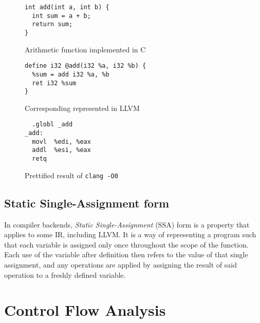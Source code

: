 \documentclass{article}
\begin{document}
\begin{figure}[!ht]
   \begin{minipage}{0.48\textwidth}
     \centering
     \begin{verbatim}
int add(int a, int b) {
  int sum = a + b;
  return sum;
}
     \end{verbatim}
     \caption{Arithmetic function implemented in C}\label{fig:addc}
   \end{minipage}\hfill
   \begin{minipage}{0.48\textwidth}
     \centering
     \begin{verbatim}
define i32 @add(i32 %a, i32 %b) {
  %sum = add i32 %a, %b
  ret i32 %sum
}
     \end{verbatim}
     \caption{Corresponding represented in LLVM}\label{fig:addll}
   \end{minipage}
   \begin{center}
   \begin{minipage}{0.48\textwidth}
     \centering
     \begin{verbatim}
  .globl _add
_add:
  movl	%edi, %eax
  addl	%esi, %eax
  retq
     \end{verbatim}
     \caption{Prettified result of \texttt{clang -O0}}\label{fig:addx86}
   \end{minipage}
   \end{center}
\end{figure}


\subsection{Static Single-Assignment form}
In compiler backends, \textit{Static Single-Assignment} (SSA) form is a property that applies to some IR, including LLVM.
It is a way of representing a program such that each variable is assigned only once throughout
the scope of the function. Each use of the variable after definition then refers to the value  of that  single assignment, and any operations are applied by assigning the result of said operation to a freshly defined variable.


\section{Control Flow Analysis}
\end{document}
